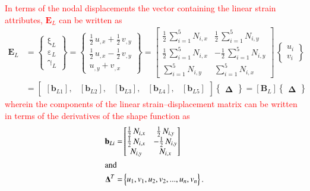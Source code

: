 \textcolor{red}{In terms of the nodal displacements the vector containing the linear strain attributes, $\mathbf{E}_L$ can be written as}
\begin{equation}
\begin{aligned}
\mathbf{E}_L & =  \begin{Bmatrix}
\mathrm \xi_{L} \\
\mathrm \varepsilon_{L} \\
\mathrm \gamma_{L} \end{Bmatrix} = 
\begin{Bmatrix}
\tfrac{1}{2} \, u_{,x} +   \tfrac{1}{2} \, v_{,y} \\
\tfrac{1}{2} \, u_{,x} - \tfrac{1}{2} \, v_{,y} \\
u_{,y} + v_{,x} \end{Bmatrix} = \begin{bmatrix}
\tfrac{1}{2} \, \sum\nolimits_{i=1}^5 N_{i,x}  & \tfrac{1}{2} \, \sum\nolimits_{i=1}^5 N_{i,y}  \\
\tfrac{1}{2} \, \sum\nolimits_{i=1}^5 N_{i,x}  & -\tfrac{1}{2} \, \sum\nolimits_{i=1}^5 N_{i,y}  \\ \sum\nolimits_{i=1}^5 N_{i,y}  & \sum\nolimits_{i=1}^5 N_{i,x}  \end{bmatrix} \, \begin{Bmatrix}
u_{i} \\
v_{i} \end{Bmatrix} \\
& = \begin{bmatrix}
[\mathbf{b}_{L1}], & [\mathbf{b}_{L2}], & [\mathbf{b}_{L3}], & [\mathbf{b}_{L4}], & [\mathbf{b}_{L5}] 
\end{bmatrix}  \begin{Bmatrix} \boldsymbol{\Delta} \end{Bmatrix}  
= [\mathbf{B}_L] \begin{Bmatrix} \boldsymbol{\Delta} \end{Bmatrix} 
\end{aligned}
\end{equation}
\textcolor{red}{wherein the components of the linear strain--displacement matrix can be written in terms of the derivatives of the shape function as}
\begin{subequations}
	\begin{align}
	\mathbf{b}_{Li} = & \begin{bmatrix}
	\tfrac{1}{2} \, N_{i,x}  &  \tfrac{1}{2} \, N_{i,y} \\
	\tfrac{1}{2} \, N_{i,x}  & - \tfrac{1}{2} \, N_{i,y} \\
	N_{i,y} & N_{i,x}  \end{bmatrix}\\
	\intertext{and}
	\mathbf{\Delta}^T  = &
	\begin{Bmatrix}
	u_1, v_1, u_2, v_2, ...,u_n, v_n
	\end{Bmatrix}.
	\end{align}
\end{subequations}
